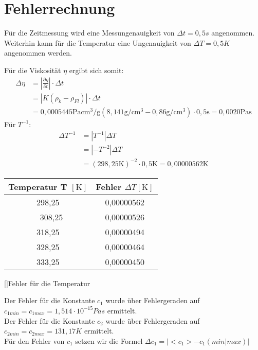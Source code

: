\chapter{Fehlerrechnung}
    Für die Zeitmessung wird eine Messungenauigkeit von $\Delta t = 0,5s$ angenommen. Weiterhin kann für die Temperatur eine Ungenauigkeit von $\Delta T = 0,5 K$ angenommen werden.
    
    Für die Viskosität $\eta$ ergibt sich somit:
    \begin{align*}
    	\Delta\eta &= \left| \frac{\partial \eta}{\partial t} \right| \cdot \Delta t \\
        		& = \left| K (\rho_k - \rho_{Fl}) \right| \cdot \Delta t \\
                & = 0,0005445 \si{\pascal\centi\metre^3\per\gram} (8,141 \si{\gram\per\centi\metre^3} - 0,86 \si{\gram\per\centi\metre^3}) \cdot 0,5 \si{\second} = 0,0020 \si{\pascal\second}
    \end{align*}
    Für $T^{-1}$:
    \begin{align*}
    \Delta T^{-1} &= \left| T^{-1} \right| \Delta T \\
    & = \left| -T^{-2} \right| \Delta T \\
    &= (298,25 \si{\kelvin})^{-2} \cdot 0,5 \si{\kelvin} = 0,00000562 \si{\kelvin}
    \end{align*}
    
    
    \begin{center}
    \begin{tabular}{c|c}
    Temperatur T $[\si{\kelvin}]$& Fehler $\Delta T  [\si{\kelvin}]$\\ \hline \hline
    298,25 &  0,00000562 \\ 
	308,25 &  0,00000526 \\
	318,25 &  0,00000494 \\
	328,25 &  0,00000464 \\
	333,25 &  0,00000450 \\
    \end{tabular}
    []{Fehler für die Temperatur}
 	\end{center}   
   Der Fehler für die Konstante $c_1$ wurde über Fehlergeraden auf $ c_{1min} = c_{1max} = 1,514\cdot10^{-15} Pas$ ermittelt. \\
   Der Fehler für die Konstante $c_2$ wurde über Fehlergeraden auf $ c_{2min} = c_{2max} = 131,17 K$ ermittelt.\\
   
   Für den Fehler von $c_1$ setzen wir die Formel $\Delta c_1 = \left| <c_1> - c_1(min|max)\right|$
   
